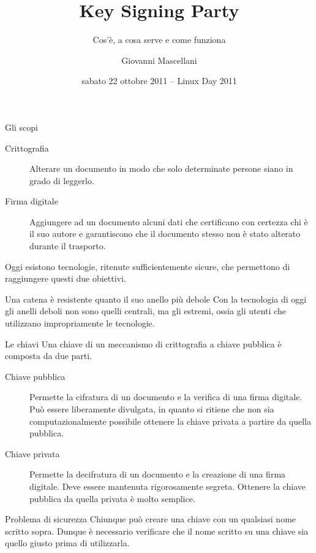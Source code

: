 \documentclass{beamer}
\title{Key Signing Party}
\subtitle{Cos'è, a cosa serve e come funziona}
\author{Giovanni Mascellani}
\date[Linux Day 2011]{sabato 22 ottobre 2011 -- Linux Day 2011}
\institute[GULP]{Gruppo Utenti Linux -- Pisa}
\begin{document}
\begin{frame}
 \maketitle
\end{frame}

\begin{frame}{Gli scopi}
 \begin{description}
  \item[Crittografia] Alterare un documento in modo che solo determinate persone
   siano in grado di leggerlo.
  \item[Firma digitale] Aggiungere ad un documento alcuni dati che certificano
   con certezza chi è il suo autore e garantiscono che il documento stesso non
   è stato alterato durante il trasporto.
  \end{description}

  Oggi esistono tecnologie, ritenute sufficientemente sicure, che permettono di
  raggiungere questi due obiettivi.

  \pause

  \begin{alertblock}{Una catena è resistente quanto il suo anello più debole}
    Con la tecnologia di oggi gli anelli deboli non sono quelli centrali, ma
    gli estremi, ossia gli utenti che utilizzano impropriamente le tecnologie.
  \end{alertblock}
\end{frame}

\begin{frame}{Le chiavi}
 Una chiave di un meccanismo di crittografia a chiave pubblica è
 composta da due parti.

 \begin{description}
  \item[Chiave pubblica] Permette la cifratura di un documento e la verifica di
   una firma digitale. Può essere liberamente divulgata, in quanto si ritiene
   che non sia computazionalmente possibile ottenere la chiave privata a partire
   da quella pubblica.
  \item[Chiave privata] Permette la decifratura di un documento e la creazione
   di una firma digitale. Deve essere mantenuta rigorosamente segreta. Ottenere
   la chiave pubblica da quella privata è molto semplice.
 \end{description}

 \pause

 \begin{alertblock}{Problema di sicurezza}
   Chiunque può creare una chiave con un qualsiasi nome scritto sopra. Dunque
   è necessario verificare che il nome scritto su una chiave sia quello giusto
   prima di utilizzarla.
 \end{alertblock}
\end{frame}
\end{document}
